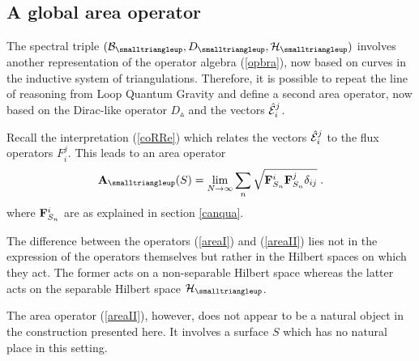 \documentclass[12pt]{article}
\newcommand{\ba}{\begin{eqnarray}}
\newcommand{\ea}{\end{eqnarray}}
\def\d{\delta}
\def\cb{{\cal B}}
\def\ce{{\cal E}}
\def\ch{{\cal H}}
\begin{document}
\subsection{A global area operator}

The spectral triple $(\cb_{\smalltriangleup},D_{\smalltriangleup},\ch_\smalltriangleup)$ involves another representation of the operator algebra (\ref{opbra}), now based on curves in the inductive system of triangulations. Therefore, it is possible to repeat the line of reasoning from Loop Quantum Gravity and define a second area operator, now based on the Dirac-like operator $D_{\smalltriangleup}$ and the vectors $\hat{\ce}^j_i$.

Recall the interpretation (\ref{coRRe}) which relates the vectors $\hat{\ce}^j_i$ to the flux operators $F_i^j$. This leads to an area operator 
\ba 
{\bf A}_{{\smalltriangleup}}(S)=\lim_{N\rightarrow \infty}\sum_n \sqrt{{\bf F}^i_{S_n}{\bf F}^j_{S_n}\d_{ij}}\;.
\label{areaII}
\ea
where ${\bf F}^i_{S_n}$ are as explained in section \ref{canqua}.


The difference between the operators (\ref{areaI}) and (\ref{areaII}) lies not in the expression of the operators themselves but rather in the Hilbert spaces on which they act. The former acts on a non-separable Hilbert space whereas the latter acts on the separable Hilbert space $\ch_\smalltriangleup$. 





The area operator (\ref{areaII}), however, does not appear to be a natural object in the construction presented here. It involves a  surface $S$ which has no natural place in this setting. 
\end{document}
